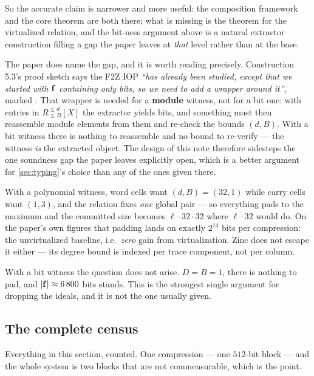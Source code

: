 \begin{warning}
So the accurate claim is narrower and more useful: the composition framework and
the core theorem are both there; what is missing is the theorem for the
virtualized relation, and the bit-ness argument above is a natural extractor
construction filling a gap the paper leaves at \emph{that} level rather than at
the base.

The paper does name the gap, and it is worth reading precisely. Construction
5.3's proof sketch says the F2Z IOP \emph{``has already been studied, except that
we started with $\mathbf{f}$ containing only bits, so we need to add a wrapper around
it''}, marked . That wrapper is needed for a \textbf{module} witness,
not for a bit one: with entries in $R^{\leq d}_{\leq B}[X]$ the extractor yields
bits, and something must then reassemble module elements from them and re-check
the bounds $(d,B)$. With a bit witness there is nothing to reassemble and no
bound to re-verify --- the witness \emph{is} the extracted object. The design of
this note therefore sidesteps the one soundness gap the paper leaves explicitly
open, which is a better argument for \cref{sec:typing}'s choice than any of the
ones given there.
\end{warning}

\begin{remark}\label{rem:typing}
With a polynomial witness, word cells want $(d,B)=(32,1)$ while carry cells want
$(1,3)$, and the relation fixes \emph{one} global pair --- so everything pads to
the maximum and the committed size becomes $\ell\cdot32\cdot32$ where
$\ell\cdot32$ would do. On the paper's own figures that padding lands on exactly
$2^{14}$ bits per compression: the unvirtualized baseline, i.e.\ \emph{zero}
gain from virtualization. Zinc\raisebox{0.1ex}{+} does not escape it either --- its
degree bound is indexed per trace component, not per column.

With a bit witness the question does not arise. $D=B=1$, there is nothing to
pad, and $|\mathbf{f}|\approx6\,800$ bits stands. This is the strongest single argument
for dropping the ideals, and it is not the one usually given.
\end{remark}

\subsection{The complete census}\label{sec:census}

Everything in this section, counted. One compression --- one $512$-bit block ---
and the whole system is two blocks that are not commensurable, which is the
point.

